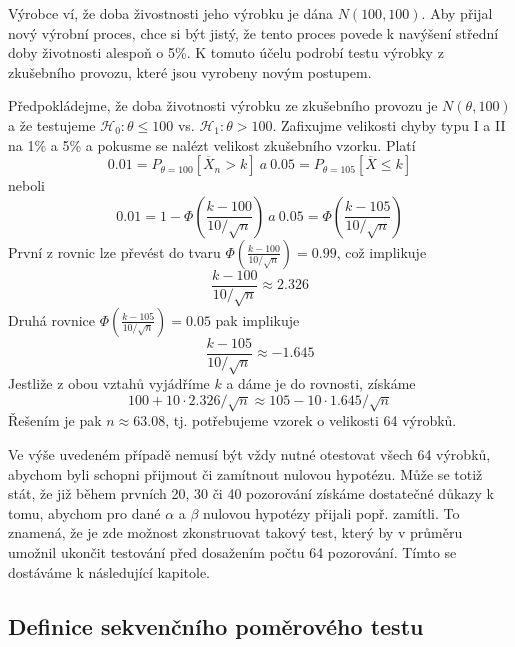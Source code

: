 \begin{example}
Výrobce ví, že doba živostnosti jeho výrobku je dána $N(100, 100)$. Aby přijal nový výrobní proces, chce si být jistý, že tento proces povede k navýšení střední doby životnosti alespoň o 5\%. K tomuto účelu podrobí testu výrobky z zkušebního provozu, které jsou vyrobeny novým postupem.

Předpokládejme, že doba životnosti výrobku ze zkušebního provozu je $N(\theta, 100)$ a že testujeme $\mathscr{H}_0: \theta \le 100$ vs. $\mathscr{H}_1: \theta > 100$. Zafixujme velikosti chyby typu I a II na 1\% a 5\% a pokusme se nalézt velikost zkušebního vzorku. Platí
\begin{equation*}
0.01 = P_{\theta = 100}[\overline{X}_n > k] ~ \textit{a} ~ 0.05 = P_{\theta = 105}[\overline{X} \le k]
\end{equation*}
neboli
\begin{equation*}
0.01 = 1 - \Phi \left(\frac{k - 100}{10 / \sqrt{n}}\right) ~ \textit{a} ~ 0.05 = \Phi \left(\frac{k - 105}{10 / \sqrt{n}}\right)
\end{equation*}
První z rovnic lze převést do tvaru $\Phi \left(\frac{k - 100}{10 / \sqrt{n}}\right) = 0.99$, což implikuje
\begin{equation*}
\frac{k - 100}{10 / \sqrt{n}} \approx 2.326
\end{equation*}
Druhá rovnice $\Phi \left(\frac{k - 105}{10 / \sqrt{n}}\right) = 0.05$ pak implikuje
\begin{equation*}
\frac{k - 105}{10 / \sqrt{n}} \approx -1.645
\end{equation*}
Jestliže z obou vztahů vyjádříme $k$ a dáme je do rovnosti, získáme
\begin{equation*}
100 + 10 \cdot 2.326 / \sqrt{n} \approx 105 - 10 \cdot 1.645 / \sqrt{n}
\end{equation*}
Řešením je pak $n \approx 63.08$, tj. potřebujeme vzorek o velikosti 64 výrobků.
\end{example}

Ve výše uvedeném případě nemusí být vždy nutné otestovat všech 64 výrobků, abychom byli schopni přijmout či zamítnout nulovou hypotézu. Může se totiž stát, že již během prvních 20, 30 či 40 pozorování získáme dostatečné důkazy k tomu, abychom pro dané $\alpha$ a $\beta$ nulovou hypotézy přijali popř. zamítli. To znamená, že je zde možnost zkonstruovat takový test, který by v průměru umožnil ukončit testování před dosažením počtu 64 pozorování. Tímto se dostáváme k následující kapitole.

\subsection{Definice sekvenčního poměrového testu}

